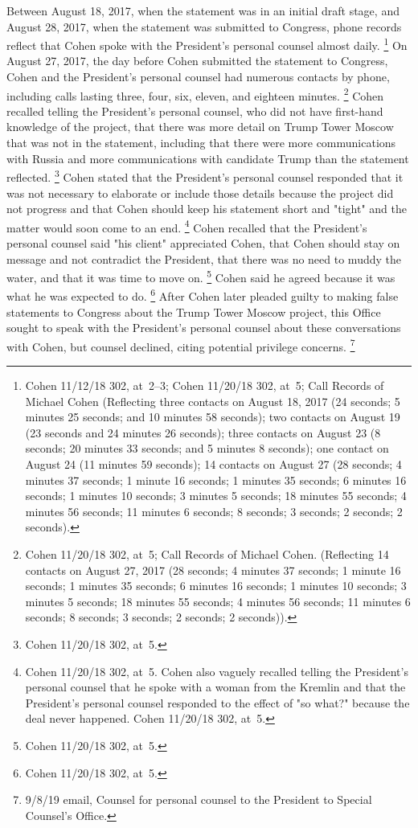 {Between August 18, 2017, when the statement was in an initial draft stage, and August 28, 2017, when the statement was submitted to Congress, phone records reflect that Cohen spoke with the President's personal counsel almost daily.%
\footnote{Cohen 11/12/18 302, at~2--3;
Cohen 11/20/18 302, at~5;
Call Records of Michael Cohen (Reflecting three contacts on August 18, 2017 (24 seconds;
5 minutes 25 seconds;
and 10 minutes 58 seconds);
two contacts on August 19 (23 seconds and 24 minutes 26 seconds);
three contacts on August 23 (8 seconds; 20 minutes 33 seconds;
and 5 minutes 8 seconds);
one contact on August 24 (11 minutes 59 seconds);
14 contacts on August 27 (28 seconds;
4 minutes 37 seconds;
1 minute 16 seconds;
1 minutes 35 seconds;
6 minutes 16 seconds;
1 minutes 10 seconds;
3 minutes 5 seconds;
18 minutes 55 seconds;
4 minutes 56 seconds;
11 minutes 6 seconds;
8 seconds;
3 seconds;
2 seconds;
2 seconds).}
On August 27, 2017, the day before Cohen submitted the statement to Congress, Cohen and the President's personal counsel had numerous contacts by phone, including calls lasting three, four, six, eleven, and eighteen minutes.%
\footnote{Cohen 11/20/18 302, at~5;
Call Records of Michael Cohen.
(Reflecting 14 contacts on August 27, 2017 (28 seconds;
4 minutes 37 seconds;
1 minute 16 seconds;
1 minutes 35 seconds;
6 minutes 16 seconds;
1 minutes 10 seconds;
3 minutes 5 seconds;
18 minutes 55 seconds;
4 minutes 56 seconds;
11 minutes 6 seconds;
8 seconds;
3 seconds;
2 seconds;
2 seconds)).
}
Cohen recalled telling the President's personal counsel, who did not have first-hand knowledge of the project, that there was more detail on Trump Tower Moscow that was not in the statement, including that there were more communications with Russia and more communications with candidate Trump than the statement reflected.%
\footnote{Cohen 11/20/18 302, at~5.}
Cohen stated that the President's personal counsel responded that it was not necessary to elaborate or include those details because the project did not progress and that Cohen should keep his statement short and "tight" and the matter would soon come to an end.%
\footnote{Cohen 11/20/18 302, at~5.
Cohen also vaguely recalled telling the President's personal counsel that he spoke with a woman from the Kremlin and that the President's personal counsel responded to the effect of "so what?" because the deal never happened.
Cohen 11/20/18 302, at~5.}
Cohen recalled that the President's personal counsel said "his client" appreciated Cohen, that Cohen should stay on message and not contradict the President, that there was no need to muddy the water, and that it was time to move on.%
\footnote{Cohen 11/20/18 302, at~5.}
Cohen said he agreed because it was what he was expected to do.%
\footnote{Cohen 11/20/18 302, at~5.}
After Cohen later pleaded guilty to making false statements to Congress about the Trump Tower Moscow project, this Office sought to speak with the President's personal counsel about these conversations with Cohen, but counsel declined, citing potential privilege concerns.%
\footnote{9/8/19 email, Counsel for personal counsel to the President to Special Counsel's Office.}

}
